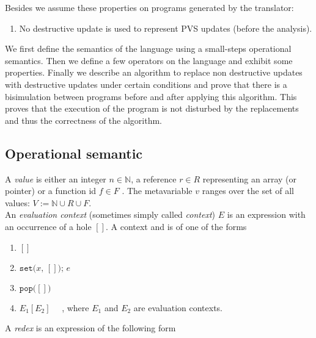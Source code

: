\documentclass[12pt,a4paper]{article}
\newcommand{\cl}[1]{\texttt{#1}}
\newcommand{\N}{\mathbb{N}}
\newcommand{\econt}[1]{[#1]}
\begin{document}
Besides we assume these properties on programs generated by the translator:
\begin{enumerate}
\item No destructive update is used to represent PVS updates (before the analysis).
\end{enumerate}

We first define the semantics of the language using a small-steps operational semantics. Then we define a few operators on the language and exhibit some properties.
Finally we describe an algorithm to replace non destructive updates with destructive updates under certain conditions and prove that there is a bisimulation between programs before and after applying this algorithm. This proves that the execution of the program is not disturbed by the replacements and thus the correctness of the algorithm.



\subsection{Operational semantic}

A \emph{value} is either an integer $n \in \N$, a reference $r \in R$ representing an array (or pointer) or a function id $f \in F$ . The metavariable $v$ ranges over the set of all values: $V := \N \cup R \cup F$.\\

An \emph{evaluation context} (sometimes simply called \emph{context}) $E$ is an expression with an occurrence of a hole $\econt{}$. A context  and is of one of the forms
\begin{enumerate}
\itemsep-0.2em
\item $\econt{}$
\item $\cl{set(} x \cl{, } \econt{} \cl{); } e$
\item $\cl{pop(} \econt{} \cl{)}$
\item $E_1\econt{E_2}$ \ \ , where $E_1$ and $E_2$ are evaluation contexts.
\end{enumerate}
A \emph{redex} is an expression of the following form
\end{document}
